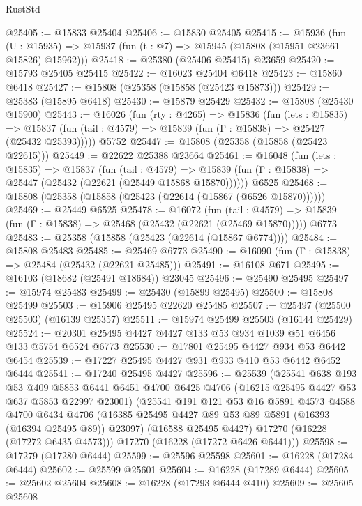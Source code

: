 \begin{lexlean}{RustStd}
\begin{coremodule}
@25405 := @15833 @25404
@25406 := @15830 @25405
@25415 := @15936
    (fun (U : @15935) => @15937 (fun (t : @7) => @15945 (@15808 (@15951 @23661 @15826) @15962)))
@25418 := @25380 (@25406 @25415) @23659
@25420 := @15793 @25405 @25415
@25422 := @16023 @25404 @6418
@25423 := @15860 @6418
@25427 := @15808 (@25358 (@15858 (@25423 @15873)))
@25429 := @25383 (@15895 @6418)
@25430 := @15879 @25429
@25432 := @15808 (@25430 @15900)
@25443 := @16026
    (fun (rty : @4265) =>
    @15836
      (fun (lets : @15835) =>
      @15837 (fun (tail : @4579) => @15839 (fun (Γ : @15838) => @25427 (@25432 @25393)))))
    @5752
@25447 := @15808 (@25358 (@15858 (@25423 @22615)))
@25449 := @22622 @25388 @23664
@25461 := @16048
    (fun (lets : @15835) =>
    @15837
      (fun (tail : @4579) =>
      @15839 (fun (Γ : @15838) => @25447 (@25432 (@22621 (@25449 @15868 @15870))))))
    @6525
@25468 := @15808 (@25358 (@15858 (@25423 (@22614 (@15867 (@6526 @15870))))))
@25469 := @25449 @6525
@25478 := @16072
    (fun (tail : @4579) => @15839 (fun (Γ : @15838) => @25468 (@25432 (@22621 (@25469 @15870)))))
    @6773
@25483 := @25358 (@15858 (@25423 (@22614 (@15867 @6774))))
@25484 := @15808 @25483
@25485 := @25469 @6773
@25490 := @16090 (fun (Γ : @15838) => @25484 (@25432 (@22621 @25485)))
@25491 := @16108 @671
@25495 := @16103 (@18682 (@25491 @18684)) @23045
@25496 := @25490 @25495
@25497 := @15974 @25483
@25499 := @25430 (@15899 @25495)
@25500 := @15808 @25499
@25503 := @15906 @25495 @22620 @25485
@25507 := @25497 (@25500 @25503) (@16139 @25357)
@25511 := @15974 @25499 @25503 (@16144 @25429)
@25524 := @20301 @25495 @4427 @4427 @133 @53 @934 @1039 @51 @6456 @133 @5754 @6524 @6773
@25530 := @17801 @25495 @4427 @934 @53 @6442 @6454
@25539 := @17227 @25495 @4427 @931 @933 @410 @53 @6442 @6452 @6444
@25541 := @17240 @25495 @4427
@25596 := @25539
    (@25541
      @638
      @193
      @53
      @409
      @5853
      @6441
      @6451
      @4700
      @6425
      @4706
      (@16215 @25495 @4427 @53 @637 @5853 @22997 @23001)
      (@25541
        @191
        @121
        @53
        @16
        @5891
        @4573
        @4588
        @4700
        @6434
        @4706
        (@16385 @25495 @4427 @89 @53 @89 @5891 (@16393 (@16394 @25495 @89)) @23097)
        (@16588 @25495 @4427)
        @17270
        (@16228 (@17272 @6435 @4573)))
      @17270
      (@16228 (@17272 @6426 @6441)))
@25598 := @17279 (@17280 @6444)
@25599 := @25596 @25598
@25601 := @16228 (@17284 @6444)
@25602 := @25599 @25601
@25604 := @16228 (@17289 @6444)
@25605 := @25602 @25604
@25608 := @16228 (@17293 @6444 @410)
@25609 := @25605 @25608

\end{coremodule}
\end{lexlean}
